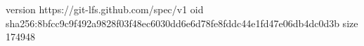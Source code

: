 version https://git-lfs.github.com/spec/v1
oid sha256:8bfcc9c9f492a9828f03f48ec6030dd6e6d78fe8fddc44e1fd47e06db4dc0d3b
size 174948
